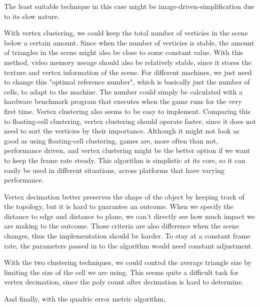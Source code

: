 \documentclass[12pt]{article}
\begin{document}
The least suitable technique in this case might be image-driven-simplification due to its slow nature. \par
With vertex clustering, we could keep the total number of verticies in the scene below a certain amount. Since when the number
of verticies is stable, the amount of triangles in the scene might also be close to some constant value. With this method, video 
memory useage should also be relatively stable, since it stores the texture and vertex information of the scene. For different 
machines, we just need to change this "optimal reference number", which is basically just the number of cells, 
to adapt to the machine. The number could simply be calculated with a hardware benchmark program that executes when the game 
runs for the very first time. Vertex clustering also seems to be easy to implement. Comparing this to floating-cell clustering,
vertex clustering should operate faster, since it does not need to sort the verticies by their importance. Although it might not look
as good as using floating-cell clustering, games are, more often than not, performance driven, and vertex clustering might be the 
better option if we want to keep the frame rate steady. This algorithm is simplistic at its core, so it can easily be used in
different situations, across platforms that have varying performance.\par

Vertex decimation better preserves the shape of the object by keeping track of the topology, but it is hard to guarantee an outcome.
When we specify the distance to edge and distance to plane, we can't directly see how much impact we are making to the outcome. Those
criteria are also difference when the scene changes, thus the implementation should be harder. To stay at a constant frame rate, 
the parameters passed in to the algorithm would need constant adjustment. \par

With the two clustering techniques, we could control the average triangle size by limiting the size of the cell we are using. This 
seems quite a difficult task for vertex decimation, since the poly count after decimation is hard to determine. \par

And finally, with the quadric error metric algorithm, 
\end{document}
